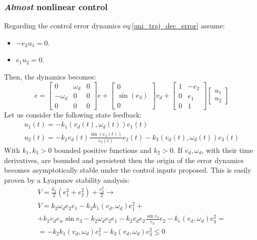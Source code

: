 \subsubsection{\textit{Almost} nonlinear control}
Regarding the control error dynamics eq:\ref{uni_traj_dec_error} assume:
\begin{itemize}
    \item $-e_2u_1=0$.
    \item $e_1u_2=0$.
\end{itemize}
Then, the dynamics becomes:
\begin{equation*}
    \dot{e}=
    \begin{bmatrix}
        0 & \omega_d & 0 \\
        -\omega_d & 0 & 0 \\
        0 & 0 & 0
    \end{bmatrix}e+
    \begin{bmatrix}
        0 \\ \sin(e_3) \\ 0
    \end{bmatrix}v_d +
    \begin{bmatrix}
        1 & -e_2 \\ 0 & e_1 \\ 0 & 1
    \end{bmatrix}
    \begin{bmatrix}
        u_1 \\ u_2
    \end{bmatrix}
\end{equation*}
Let us consider the following state feedback:
\begin{gather}\label{uni_traj_nonlinear_in}
    u_1(t)=-k_1(v_d(t),\omega_d(t))e_1(t) \\
    u_2(t)=-k_2v_d(t) \frac{\sin(e_3(t))}{e_3(t)}e_2(t)-k_3(v_d(t),\omega_d(t))e_3(t)
\end{gather}
With $k_1,k_3>0$ bounded positive functions and $k_2>0$. If $v_d,\omega_d$, with their time derivatives, are bounded and persistent then the origin of the error dynamics becomes asymptotically stable under the control inputs proposed. This is easily proven by a Lyapunov stability analysis:
\begin{gather*}
    V=\frac{k_2}{2}(e_1^2+e_2^2)+\frac{e_3^2}{2} \rightarrow \\
    \dot{V}=k_2\omega_de_2e_1-k_2k_1(v_d,\omega_d)e_1^2+\\
    +k_2v_de_w\sin e_3-k_2\omega_de_2e_1-k_2v_de_2\frac{\sin e_3}{e_3}e_2-k_e(v_d,\omega_d)e_3^2=\\
    =-k_2k_1(v_d,\omega_d)e_1^2-k_3(v_d,\omega_d)e_3^2\leq 0
\end{gather*}
